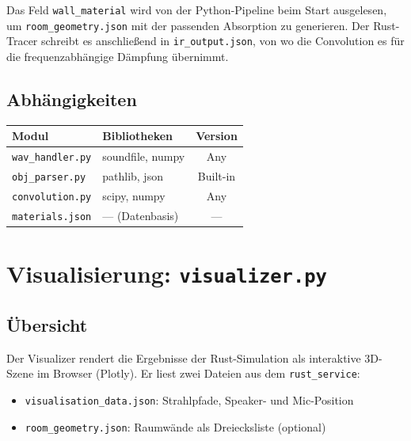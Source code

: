 \documentclass[11pt,a4paper,twoside]{report}
\begin{document}
Das Feld \texttt{wall\_material} wird von der Python-Pipeline beim
Start ausgelesen, um \texttt{room\_geometry.json} mit der passenden Absorption
zu generieren. Der Rust-Tracer schreibt es anschlie\ss{}end in \texttt{ir\_output.json},
von wo die Convolution es f\"ur die frequenzabh\"angige D\"ampfung \"ubernimmt.

\section{Abh\"angigkeiten}

\begin{table}[H]
    \centering
    \begin{tabular}{|l|l|c|}
        \hline
        \textbf{Modul} & \textbf{Bibliotheken} & \textbf{Version} \\
        \hline
        \texttt{wav\_handler.py} & soundfile, numpy & Any \\
        \hline
        \texttt{obj\_parser.py} & pathlib, json & Built-in \\
        \hline
        \texttt{convolution.py} & scipy, numpy & Any \\
        \hline
        \texttt{materials.json} & --- (Datenbasis) & --- \\
        \hline
    \end{tabular}
\end{table}

\chapter{Visualisierung: \texttt{visualizer.py}}

\section{\"Ubersicht}

Der Visualizer rendert die Ergebnisse der Rust-Simulation als interaktive
3D-Szene im Browser (Plotly). Er liest zwei Dateien aus dem \texttt{rust\_service}:

\begin{itemize}
    \item \texttt{visualisation\_data.json}: Strahlpfade, Speaker- und Mic-Position
    \item \texttt{room\_geometry.json}: Raumw\"ande als Dreiecksliste (optional)
\end{itemize}
\end{document}
